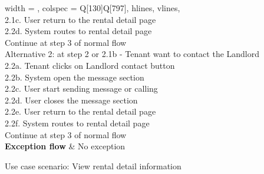 \begin{table}[H]
\begin{longtblr}[
  label = none,
  entry = none,
]{
  width = \linewidth,
  colspec = {Q[130]Q[797]},
  hlines,
  vlines,
}
{\\ 2.1c. User return to the rental detail page
\\ 2.2d. System routes to rental detail page
\\ Continue at step 3 of normal flow
\\Alternative 2: at step 2 or 2.1b - Tenant want to contact the Landlord
\\ 2.2a. Tenant clicks on Landlord contact button
\\ 2.2b. System open the message section
\\ 2.2c. User start sending message or calling
\\ 2.2d. User closes the message section
\\ 2.2e. User return to the rental detail page
\\ 2.2f. System routes to rental detail page
\\ Continue at step 3 of normal flow } \\
\textbf{Exception flow}    & No exception        \end{longtblr}
    \caption{Use case scenario: View rental detail information}
    \label{tab:usecase-scenario-view-rental-detail}
\end{table}              


